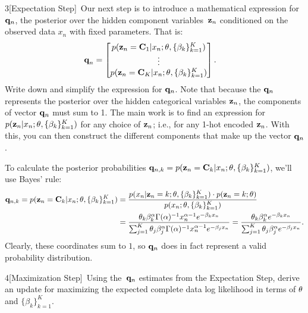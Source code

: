 \documentclass[expanded]{lkx_pset}
\begin{document}
\begin{solution}
	\begin{part}{3}[Expectation Step]\
		Our next step is to introduce a
		mathematical expression for $\mathbf{q}_n$, the posterior over the
		hidden component variables~$\mathbf{z}_n$ conditioned on the observed data
		$x_n$ with fixed parameters.
		That is:
		\begin{align*}
			\textbf{q}_n & = \begin{bmatrix}
				                 p(\mathbf{z}_n =\mathbf{C}_1| x_n; \mathbf{\theta}, \{ \beta_k \}^K_{k=1}) \\
				                 \vdots                                                     \\
				                 p(\mathbf{z}_n =\mathbf{C}_K| x_n; \mathbf{\theta}, \{ \beta_k \}^K_{k=1})
			                 \end{bmatrix}.
		\end{align*}
		Write down and simplify the expression for
		$\mathbf{q}_n$.  Note that because the $\mathbf{q}_n$ represents the
		posterior over the hidden categorical variables $\mathbf{z}_n$, the
		components of vector $\mathbf{q}_n$ must sum to 1.
		The main work is to find an expression for $p(\mathbf{z}_n|x_n; \mathbf{\theta}, \{\beta_k\}^K_{k=1})$  for any choice of $\mathbf{z}_n$; i.e., for any 1-hot encoded $\mathbf{z}_n$. With this, you can then construct the different components that make up the vector $\mathbf{q}_n$.
	\end{part}

	To calculate the posterior probabilities $\mathbf{q}_{n,k} = p(\mathbf{z}_n = \mathbf{C}_k | x_n; \theta, \{\beta_k\}^K_{k=1})$, we'll use Bayes' rule:
	\[
		\begin{aligned}
			\mathbf{q}_{n,k}=p(\mathbf{z}_n =\mathbf{C}_k | x_n; \mathbf{\theta}, \{\beta_k\}^K_{k=1})
			 & = \frac{p(x_n | \mathbf{z}_n = k; \theta, \{\beta_k\}^K_{k=1})\cdot p(\mathbf{z}_n = k; \mathbf{\theta})}{p(x_n; \theta,\{\beta_k\}^K_{k=1})}                                                \\
			 & = \frac{\theta_k \beta_k^\alpha \Gamma(\alpha)^{-1} x_n^{\alpha-1}e^{-\beta_k x_n}}{\sum^K_{j=1} \theta_j \beta_j^\alpha \Gamma(\alpha)^{-1}x_n^{\alpha-1} e^{-\beta_j x_n}}
			= \frac{\theta_k \beta_k^\alpha e^{-\beta_k x_n}}{\sum^K_{j=1}\theta_j\beta^\alpha_j e^{-\beta_j x_n}}.
		\end{aligned}
	\]
	Clearly, these coordinates sum to $1$, so $\mathbf{q}_n$ does in fact represent a valid probability distribution.

	\begin{part}{4}[Maximization Step]\
		Using the~$\mathbf{q}_n$ estimates from the Expectation Step, derive an update for maximizing the expected complete data log likelihood in terms of $\mathbf{\theta}$ and $\{ \beta_k \}^K_{k=1}$.
	\end{part}


\end{solution}
\end{document}
